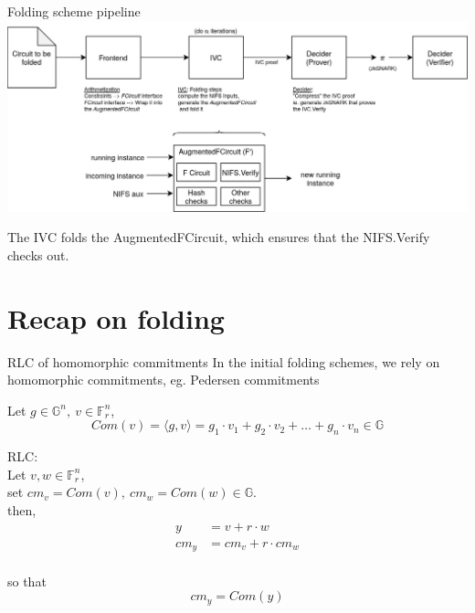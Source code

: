 \documentclass[t]{beamer} \usefonttheme[onlymath]{serif}
\begin{document}
\begin{frame}{Folding scheme pipeline}
  \includegraphics[width=\textwidth]{folding-scheme-pipeline}

  \vspace{0.5cm}
  {\scriptsize
  The IVC folds the AugmentedFCircuit, which ensures that the NIFS.Verify checks out.
  }
\end{frame}


\section{Recap on folding}

\begin{frame}{RLC of homomorphic commitments}
  \small{
    In the initial folding schemes, we rely on homomorphic commitments, eg. Pedersen commitments\\
  }

  Let $g \in \mathbb{G}^n,~ v \in \mathbb{F}_r^n$,\\
  $$Com(v) = \langle g, v \rangle =g_1 \cdot v_1 + g_2 \cdot v_2 + \ldots + g_n \cdot v_n \in \mathbb{G}$$

  RLC:\\
  Let $v, w \in \mathbb{F}_r^n$,
  \\set $cm_v = Com(v),~ cm_w=Com(w) \in \mathbb{G}$.
  \\then,
  \begin{align*}
    y &= v + r \cdot w\\
    cm_{y} &=cm_v + r \cdot cm_w
  \end{align*}
  \\so that
  $$cm_y = Com(y)$$
\end{frame}
\end{document}
